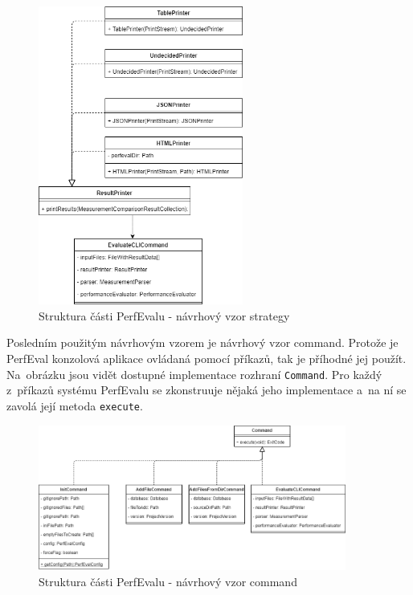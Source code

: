 \begin{figure}[!ht]
    \centering
    \includegraphics[width=0.6\textwidth]{../img/architektura-strategy.png}
    \caption{Struktura části PerfEvalu - návrhový vzor strategy}
\end{figure}

Posledním použitým návrhovým vzorem je návrhový vzor command. Protože je PerfEval
konzolová aplikace ovládaná pomocí příkazů, tak je příhodné jej použít. Na~obrázku
jsou vidět dostupné implementace rozhraní \lstinline{Command}. Pro každý z~příkazů
systému PerfEvalu se zkonstruuje nějaká jeho implementace a~na ní se zavolá její metoda
\lstinline{execute}.

\begin{figure}[!ht]
    \centering
    \includegraphics[width=0.9\textwidth]{../img/architektura-command.png}
    \caption{Struktura části PerfEvalu - návrhový vzor command}
\end{figure}

